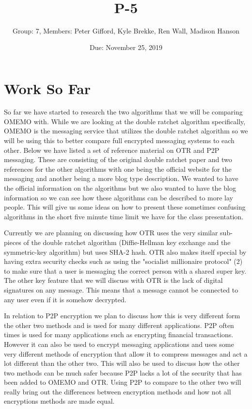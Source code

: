 \documentclass{article}
\title{P-5}
\author{Group: 7, Members: Peter Gifford, Kyle Brekke, Ren Wall, Madison Hanson}
\date{Due: November 25, 2019}
\begin{document}
\maketitle

\section{Work So Far}

So far we have started to research the two algorithms that we will be comparing OMEMO with. While we are looking at the double ratchet algorithm specifically, OMEMO is the messaging service that utilizes the double ratchet algorithm so we will be using this to better compare full encrypted messaging systems to each other. Below we have listed a set of reference material on OTR and P2P messaging. These are consisting of the original double ratchet paper and two references for the other algorithms with one being the official website for the messaging and another being a more blog type description. We wanted to have the official information on the algorithms but we also wanted to have the blog information so we can see how these algorithms can be described to more lay people. This will give us some ideas on how to present these sometimes confusing algorithms in the short five minute time limit we have for the class presentation. \newline

Currently we are planning on discussing how OTR uses the very similar sub-pieces of the double ratchet algorithm (Diffie-Hellman key exchange and  the symmetric-key algorithm)  but uses SHA-2 hash. OTR also makes itself special by having extra security checks such as using the "socialist millionaire protocol" (2) to make sure that a user is messaging the correct person with a shared super key. The other key feature that we will discuss with OTR is the lack of digital signatures on any message. This means that a message cannot be connected to any user even if it is somehow decrypted. \newline

In relation to P2P encryption we plan to discuss how this is very different form the other two methods and is used for many different applications. P2P often times is used for many applications such as encrypting financial transactions. However it can also be used to encrypt messaging applications and uses some very different methods of encryption that allow it to compress messages and act a lot different than the other two. This will also be used to discuss how the other two methods can be much safer because P2P lacks a lot of the security that has been added to OMEMO and OTR. Using P2P to compare to the other two will really bring out the differences between encryption methods and how not all encryptions methods are made equal.
\end{document}
